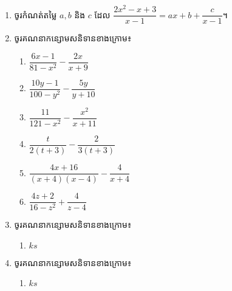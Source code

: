 \begin{enumerate}
\item ចូរកំណត់តម្លៃ $a,b$ និង $c$ ដែល $\dfrac{2x^2-x+3}{x-1}=ax+b+\dfrac{c}{x-1}$។
\item ចូរគណនាកន្សោមសនិទានខាងក្រោម៖
\begin{multicols}{3}
\begin{enumerate}[label=\alph*.]
\item $\dfrac{6x-1}{81-x^2}-\dfrac{2x}{x+9}$
\item $\dfrac{10y-1}{100-y^2}-\dfrac{5y}{y+10}$
\item $\dfrac{11}{121-x^2}-\dfrac{x^2}{x+11}$
\item $\dfrac{t}{2(t+3)}-\dfrac{2}{3(t+3)}$
\item $\dfrac{4x+16}{(x+4)(x-4)}-\dfrac{4}{x+4}$
\item $\dfrac{4z+2}{16-z^2}+\dfrac{4}{z-4}$
\end{enumerate}
\end{multicols}

\item ចូរគណនាកន្សោមសនិទានខាងក្រោម៖
\begin{multicols}{4}
\begin{enumerate}[label=\alph*.]
\item $ks$
\end{enumerate}
\end{multicols}

\item ចូរគណនាកន្សោមសនិទានខាងក្រោម៖
\begin{multicols}{4}
\begin{enumerate}[label=\alph*.]
\item $ks$
\end{enumerate}
\end{multicols}
\end{enumerate}


